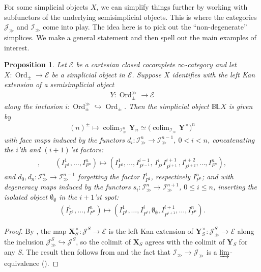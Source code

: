 \documentclass[12pt, reqno]{amsart}
\theoremstyle{plain}
\newtheorem{proposition}[theorem]{Proposition}
\theoremstyle{definition}
\begin{document}
For some simplicial objects $X$, we can simplify things further by working with subfunctors of the underlying semisimplicial objects. This is where the categories $\mathcal{J}_\gg$ and $\mathcal{I}_\gg$ come into play. The idea here is to pick out the ``non-degenerate'' simplices. We make a general statement and then spell out the main examples of interest.

\begin{proposition}\label{monoid over Igg}
Let $\mathcal{E}$ be a cartesian closed cocomplete $\infty$-category and let $X\colon \operatorname{Ord}_\pm\rightarrow \mathcal{E}$ be a simplicial object in $\mathcal{E}$. Suppose $X$ identifies with the left Kan extension of a semisimplicial object
\begin{align*}
Y\colon \operatorname{Ord}_\pm^\gg\rightarrow \mathcal{E}
\end{align*}
along the inclusion $i\colon \operatorname{Ord}_\pm^\gg\hookrightarrow \operatorname{Ord}_\pm$. Then the simplicial object $\mathbb{B}\mathbb{L}X$ is given by
\begin{align*}
(n)^\pm \mapsto \mathop{\operatorname{colim}}_{\mathcal{I}_\gg^n}\mathbf{Y}_n\simeq \big(\mathop{\operatorname{colim}}_{\mathcal{I}_\gg}\mathbf{Y}^{\times}\big)^n
\end{align*}
with face maps induced by the functors $d_i\colon \mathcal{I}_\gg^n\rightarrow \mathcal{I}_\gg^{n-1}$, $0<i<n$, concatenating the $i$'th and $(i+1)$'st factors:
\begin{align*}
,\qquad (I^1_{P^1},\ldots,I^n_{P^n})\mapsto (I^1_{P^1},\ldots,I^{i-1}_{P^{i-1}},\, I^i_{P^i}I^{i+1}_{P^{i+1}}\, , I^{i+2}_{P^{i+2}},\ldots,I^n_{P^n}),
\end{align*}
and $d_0,d_n\colon \mathcal{I}_\gg^n\rightarrow \mathcal{I}_\gg^{n-1}$ forgetting the factor $I^1_{P^1}$, respectively $I^n_{P^n}$; and with degeneracy maps induced by the functors $s_i\colon \mathcal{I}_\gg^n\rightarrow \mathcal{I}_\gg^{n+1}$, $0\leq i\leq n$, inserting the isolated object $\emptyset_\emptyset$ in the $i+1$'st spot:
\begin{align*}
(I^1_{P^1},\ldots,I^n_{P^n})\mapsto (I^1_{P^1},\ldots,I^i_{P^i},\emptyset_\emptyset,I^{i+1}_{P^{i+1}},\ldots,I^n_{P^n}).
\end{align*}
\end{proposition}
\begin{proof}
By , the map $\mathbf{X}_S^\times\colon \mathcal{J}^S\rightarrow \mathcal{E}$ is the left Kan extension of $\mathbf{Y}_S^\times\colon \mathcal{J}_\gg^S\rightarrow \mathcal{E}$ along the inclusion $\mathcal{J}_\gg^S\hookrightarrow \mathcal{J}^S$, so the colimit of $\mathbf{X}_S$ agrees with the colimit of $\mathbf{Y}_S$ for any $S$. The result then follows from  and the fact that $\mathcal{I}_\gg\rightarrow \mathcal{J}_\gg$ is a $\varinjlim$-equivalence ().
\end{proof}
\end{document}
